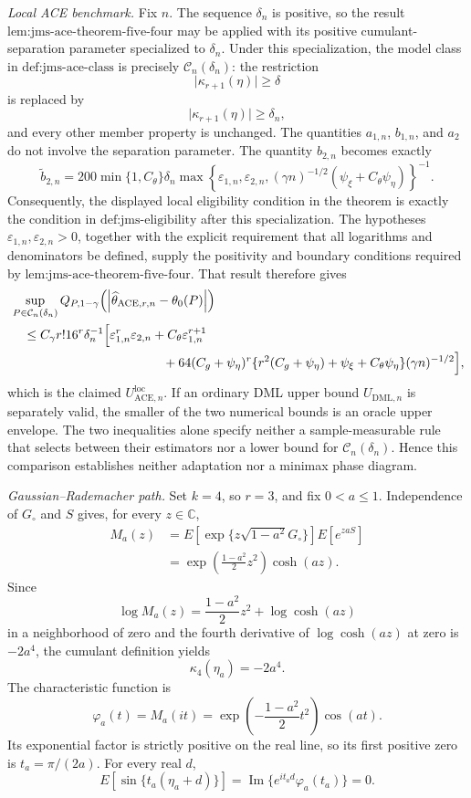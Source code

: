 \emph{Local ACE benchmark.}
Fix \(n\).  The sequence \(\delta_n\) is positive, so the result
\(\text{lem:jms-ace-theorem-five-four}\) may be applied with its positive
cumulant-separation parameter specialized to \(\delta_n\).  Under this
specialization, the model class in \(\text{def:jms-ace-class}\) is precisely
\(\mathcal C_n(\delta_n)\): the restriction
\[
 \lvert\kappa_{r+1}(\eta)\rvert\geq\delta
\]
is replaced by
\[
 \lvert\kappa_{r+1}(\eta)\rvert\geq\delta_n,
\]
and every other member property is unchanged.  The quantities \(a_{1,n}\),
\(b_{1,n}\), and \(a_2\) do not involve the separation parameter.  The
quantity \(b_{2,n}\) becomes exactly
\[
 \widetilde b_{2,n}
 =200\min\{1,C_{\theta}\}\delta_n
 \max\!\left\{
   \varepsilon_{1,n},\varepsilon_{2,n},
   (\gamma n)^{-1/2}(\psi_{\xi}+C_{\theta}\psi_{\eta})
 \right\}^{-1}.
\]
Consequently, the displayed local eligibility condition in the theorem is
exactly the condition in \(\text{def:jms-eligibility}\) after this
specialization.  The hypotheses \(\varepsilon_{1,n},\varepsilon_{2,n}>0\),
together with the explicit requirement that all logarithms and denominators
be defined, supply the positivity and boundary conditions required by
\(\text{lem:jms-ace-theorem-five-four}\).  That result therefore gives
\[
\begin{aligned}
 &\sup_{P\in\mathcal C_n(\delta_n)}
 Q_{P,1-\gamma}
 \!\left(\left|\widehat\theta_{\mathrm{ACE},r,n}-\theta_0(P)\right|\right)\\
 &\quad\leq
 C_{\gamma}r!16^r\delta_n^{-1}
 \Bigl[
   \varepsilon_{1,n}^r\varepsilon_{2,n}
   +C_{\theta}\varepsilon_{1,n}^{r+1}\\
 &\hspace{42mm}
   +64(C_g+\psi_{\eta})^r
    \{r^2(C_g+\psi_{\eta})+\psi_{\xi}+C_{\theta}\psi_{\eta}\}
    (\gamma n)^{-1/2}
 \Bigr],
\end{aligned}
\]
which is the claimed \(U_{\mathrm{ACE},n}^{\mathrm{loc}}\).  If an ordinary
DML upper bound \(U_{\mathrm{DML},n}\) is separately valid, the smaller of
the two numerical bounds is an oracle upper envelope.  The two inequalities
alone specify neither a sample-measurable rule that selects between their
estimators nor a lower bound for \(\mathcal C_n(\delta_n)\).  Hence this
comparison establishes neither adaptation nor a minimax phase diagram.

\emph{Gaussian--Rademacher path.}
Set \(k=4\), so \(r=3\), and fix \(0<a\leq1\).  Independence of
\(G_{\circ}\) and \(S\) gives, for every \(z\in\mathbb C\),
\[
\begin{aligned}
 M_a(z)
 &=E[\exp\{z\sqrt{1-a^2}G_{\circ}\}]E[e^{zaS}]\\
 &=\exp\!\left(\frac{1-a^2}{2}z^2\right)\cosh(az).
\end{aligned}
\]
Since
\[
 \log M_a(z)=\frac{1-a^2}{2}z^2+\log\cosh(az)
\]
in a neighborhood of zero and the fourth derivative of
\(\log\cosh(az)\) at zero is \(-2a^4\), the cumulant definition yields
\[
 \kappa_4(\eta_a)=-2a^4.
\]
The characteristic function is
\[
 \varphi_a(t)=M_a(it)
 =\exp\!\left(-\frac{1-a^2}{2}t^2\right)\cos(at).
\]
Its exponential factor is strictly positive on the real line, so its first
positive zero is \(t_a=\pi/(2a)\).  For every real \(d\),
\[
 E[\sin\{t_a(\eta_a+d)\}]
 =\operatorname{Im}\{e^{it_ad}\varphi_a(t_a)\}=0.
\]

